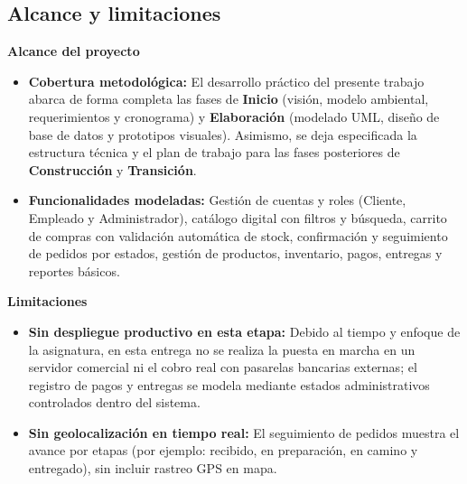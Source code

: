 \subsection{Alcance y limitaciones}

\textbf{Alcance del proyecto}
\begin{itemize}
    \item \textbf{Cobertura metodológica:} El desarrollo práctico del presente trabajo abarca de forma completa las fases de \textbf{Inicio} (visión, modelo ambiental, requerimientos y cronograma) y \textbf{Elaboración} (modelado UML, diseño de base de datos y prototipos visuales). Asimismo, se deja especificada la estructura técnica y el plan de trabajo para las fases posteriores de \textbf{Construcción} y \textbf{Transición}.
    \item \textbf{Funcionalidades modeladas:} Gestión de cuentas y roles (Cliente, Empleado y Administrador), catálogo digital con filtros y búsqueda, carrito de compras con validación automática de stock, confirmación y seguimiento de pedidos por estados, gestión de productos, inventario, pagos, entregas y reportes básicos.
\end{itemize}

\textbf{Limitaciones}
\begin{itemize}
    \item \textbf{Sin despliegue productivo en esta etapa:} Debido al tiempo y enfoque de la asignatura, en esta entrega no se realiza la puesta en marcha en un servidor comercial ni el cobro real con pasarelas bancarias externas; el registro de pagos y entregas se modela mediante estados administrativos controlados dentro del sistema.
    \item \textbf{Sin geolocalización en tiempo real:} El seguimiento de pedidos muestra el avance por etapas (por ejemplo: recibido, en preparación, en camino y entregado), sin incluir rastreo GPS en mapa.
\end{itemize}

